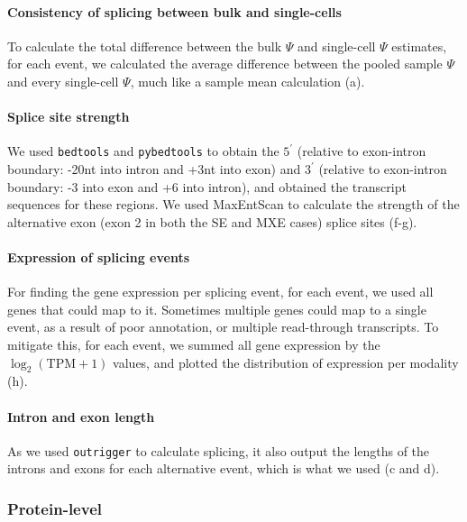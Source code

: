 \paragraph{Consistency of splicing between bulk and single-cells}
To calculate the total difference between the bulk $\Psi$ and single-cell $\Psi$ estimates, for each event, we calculated the average difference between the pooled sample $\Psi$ and every single-cell $\Psi$, much like a sample mean calculation (a).

\paragraph{Splice site strength}
We used \texttt{bedtools} \cite{Quinlan:2010kma} and \texttt{pybedtools} \cite{Dale:2011cl} to obtain the $5^\prime$ (relative to exon-intron boundary: -20nt into intron and +3nt into exon) and $3^\prime$ (relative to exon-intron boundary: -3 into exon and +6 into intron), and obtained the transcript sequences for these regions. We used MaxEntScan \cite{Yeo:2004fg} to calculate the strength of the alternative exon (exon 2 in both the SE and MXE cases) splice sites (f-g).

\paragraph{Expression of splicing events}
For finding the gene expression per splicing event, for each event, we used all genes that could map to it. Sometimes multiple genes could map to a single event, as a result of poor annotation, or multiple read-through transcripts. To mitigate this, for each event, we summed all gene expression by the $\log_2(\mathrm{TPM}+1)$ values, and plotted the distribution of expression per modality (h).

\paragraph{Intron and exon length}
As we used \texttt{outrigger} to calculate splicing, it also output the lengths of the introns and exons for each alternative event, which is what we used (c and d).


\subsubsection{Protein-level}

